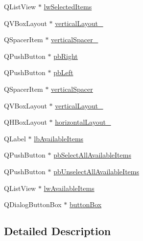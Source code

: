 \begin{DoxyCompactItemize}
\item 
Q\-List\-View $\ast$ \hyperlink{class_ui__mdt_items_selector_dialog_ae73e914dd34109a083c514868ebf581c}{lw\-Selected\-Items}
\item 
Q\-V\-Box\-Layout $\ast$ \hyperlink{class_ui__mdt_items_selector_dialog_a46a693c58b8fd32e0ecc888c38276fea}{vertical\-Layout\-\_}
\item 
Q\-Spacer\-Item $\ast$ \hyperlink{class_ui__mdt_items_selector_dialog_aefaca5b3d54784c1a3873b5cb5cc958f}{vertical\-Spacer\-\_}
\item 
Q\-Push\-Button $\ast$ \hyperlink{class_ui__mdt_items_selector_dialog_a1ebf136195b79da55228a64bf0d48eee}{pb\-Right}
\item 
Q\-Push\-Button $\ast$ \hyperlink{class_ui__mdt_items_selector_dialog_a27de1ffc1ccd673695cf6902b3af5197}{pb\-Left}
\item 
Q\-Spacer\-Item $\ast$ \hyperlink{class_ui__mdt_items_selector_dialog_ab86448aea0bb7a3a75722aac054edcc8}{vertical\-Spacer}
\item 
Q\-V\-Box\-Layout $\ast$ \hyperlink{class_ui__mdt_items_selector_dialog_a0d1b81d0206eb0f79c4a5cdcce9d8075}{vertical\-Layout\-\_}
\item 
Q\-H\-Box\-Layout $\ast$ \hyperlink{class_ui__mdt_items_selector_dialog_a3953e7b9232bb9b70d556ca74201a8a7}{horizontal\-Layout\-\_}
\item 
Q\-Label $\ast$ \hyperlink{class_ui__mdt_items_selector_dialog_a96ab760c3a735e8fed9e95c2ef1e30d8}{lb\-Available\-Items}
\item 
Q\-Push\-Button $\ast$ \hyperlink{class_ui__mdt_items_selector_dialog_aa3963010b1fc3d53a98ebb10fb384a23}{pb\-Select\-All\-Available\-Items}
\item 
Q\-Push\-Button $\ast$ \hyperlink{class_ui__mdt_items_selector_dialog_a60522f80b3aaf215fd4003465676dfdd}{pb\-Unselect\-All\-Available\-Items}
\item 
Q\-List\-View $\ast$ \hyperlink{class_ui__mdt_items_selector_dialog_a59f5bcc000500acfc8e887ab9879e356}{lw\-Available\-Items}
\item 
Q\-Dialog\-Button\-Box $\ast$ \hyperlink{class_ui__mdt_items_selector_dialog_ad107248b2f98ea1b77a5dc837cc390bb}{button\-Box}
\end{DoxyCompactItemize}


\subsection{Detailed Description}



